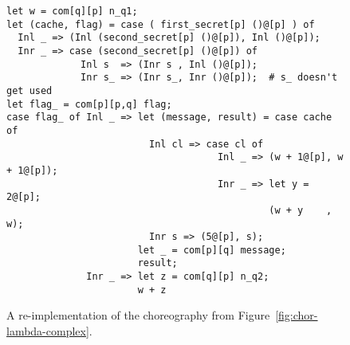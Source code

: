 \begin{figure}[tbhp]
    \begin{mdframed}
    \begin{verbatim}
let w = com[q][p] n_q1;
let (cache, flag) = case ( first_secret[p] ()@[p] ) of
  Inl _ => (Inl (second_secret[p] ()@[p]), Inl ()@[p]);
  Inr _ => case (second_secret[p] ()@[p]) of
             Inl s  => (Inr s , Inl ()@[p]);
             Inr s_ => (Inr s_, Inr ()@[p]);  # s_ doesn't get used
let flag_ = com[p][p,q] flag;
case flag_ of Inl _ => let (message, result) = case cache of
                         Inl cl => case cl of
                                     Inl _ => (w + 1@[p], w + 1@[p]);
                                     Inr _ => let y = 2@[p];
                                              (w + y    , w);
                         Inr s => (5@[p], s);
                       let _ = com[p][q] message;
                       result;
              Inr _ => let z = com[q][p] n_q2;
                       w + z
    \end{verbatim}
        \caption{A \HLSCentral re-implementation of the choreography from Figure~\ref{fig:chor-lambda-complex}.}
    \label{fig:our-complex-human}
    \end{mdframed}
\end{figure}




